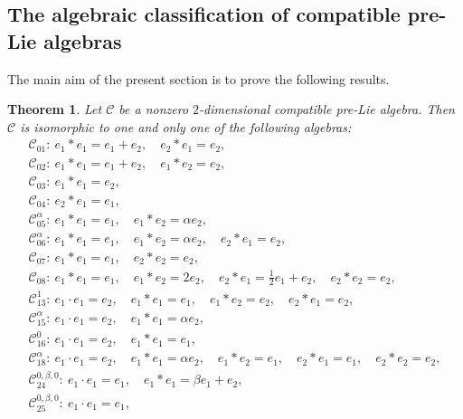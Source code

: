 \documentclass[pdftex]{sigma}
\numberwithin{equation}{section}
\newtheorem{Theorem}{Theorem}[section]
\begin{document}
\subsection{The algebraic classification of compatible pre-Lie algebras}
The main aim of the present section is to prove the following results.


\begin{Theorem}
\label{compre2} Let $\mathcal{C}$ be a nonzero $2$-dimensional compatible pre-Lie algebra.
Then $\mathcal{C}$ is isomorphic to one {and only one} of the following
algebras:
\begin{gather*}
 \mathcal{C}_{01} \colon\ e_{1} \ast e_{1} = e_{1} + e_{2},\quad e_{2} \ast e_{1} =e_{2},\\
 \mathcal{C}_{02} \colon\ e_{1}\ast e_{1} = e_{1} + e_{2}, \quad e_{1}\ast e_{2} =e_{2}, \\
 \mathcal{C}_{03} \colon\ e_{1}\ast e_{1} =e_{2},\\
 \mathcal{C}_{04} \colon\ e_{2} \ast e_{1} =e_{1}, \\
 \mathcal{C}_{05}^{\alpha} \colon\ e_{1}\ast e_{1} =e_{1},\quad e_{1}\ast e_{2} = \alpha e_{2}, \\
 \mathcal{C}_{06}^{\alpha} \colon\ e_{1} \ast e_{1} =e_{1}, \quad e_{1} \ast e_{2} = \alpha e_{2}, \quad e_{2} \ast e_{1} =e_{2}, \\
 \mathcal{C}_{07} \colon\ e_{1}\ast e_{1} =e_{1},\quad e_{2}\ast e_{2}=e_{2}, \\
 \mathcal{C}_{08} \colon\ e_{1}\ast e_{1} =e_{1}, \quad e_{1}\ast e_{2} = 2 e_{2},\quad e_{2}\ast e_{1} =\tfrac{1}{2} e_{1} + e_2, \quad e_{2}\ast e_{2}=e_{2}, \\
 \mathcal{C}_{13}^{1 }\colon\
e_{1}\cdot e_{1}=e_{2}, \quad
e_{1}\ast e_{1}= e_{1},\quad e_{1}\ast e_{2}=e_{2},\quad e_{2}\ast
e_{1}= e_{2},
\\
 \mathcal{C}_{15}^{\alpha }\colon\
 e_{1}\cdot e_{1}=e_{2}, \quad
 e_{1}\ast e_{1}=\alpha e_{2},
\\
 \mathcal{C}_{16}^{0 }\colon\
 e_{1}\cdot e_{1}=e_{2}, \quad
 e_{1}\ast e_{1}=e_{1},
\\
 \mathcal{C}_{18}^{\alpha }\colon\
 e_{1}\cdot e_{1}=e_{2}, \quad
 e_{1}\ast e_{1}=\alpha e_{2},\quad e_{1}\ast e_{2}=e_{1},\quad e_{2}\ast
e_{1}=e_{1}, \quad e_{2}\ast e_{2}=e_{2},
\\
 \mathcal{C}_{24}^{0 ,\beta ,0 }\colon\
 e_{1}\cdot e_{1}=e_{1}, \quad
 e_{1}\ast e_{1}=\beta e_{1}+e_{2},
\\
 \mathcal{C}_{25}^{0 ,\beta ,0 }\colon\
 e_{1}\cdot e_{1}=e_{1}, \quad

\end{gather*}
\end{Theorem}
\end{document}

